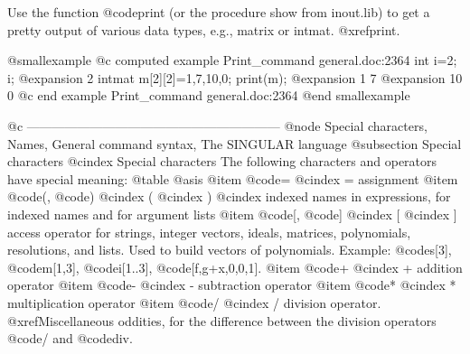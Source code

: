 Use the function @code{print} (or the procedure show from inout.lib)
to get a pretty output of various data
types, e.g., matrix or intmat. @xref{print}.

@smallexample
@c computed example Print_command general.doc:2364 
  int i=2;
  i;
@expansion{} 2
  intmat m[2][2]=1,7,10,0;
  print(m);
@expansion{}      1     7
@expansion{}     10     0
@c end example Print_command general.doc:2364
@end smallexample

@c ------------------------------------------------------------
@node Special characters, Names, General command syntax, The SINGULAR language
@subsection Special characters
@cindex Special characters
The following characters and operators have special meaning:
@table @asis
@item @code{=}
@cindex =
assignment
@item @code{(}, @code{)}
@cindex (
@cindex )
@cindex indexed names
in expressions, for indexed names and for argument lists
@item @code{[}, @code{]}
@cindex [
@cindex ]
access operator for strings, integer vectors, ideals, matrices,
polynomials, resolutions, and lists.  Used to build vectors of
polynomials.  Example: @code{s[3]}, @code{m[1,3]}, @code{i[1..3]},
@code{[f,g+x,0,0,1]}.
@item @code{+}
@cindex +
addition operator
@item @code{-}
@cindex -
subtraction operator
@item @code{*}
@cindex *
multiplication operator
@item @code{/}
@cindex /
division  operator.  @xref{Miscellaneous oddities}, for the difference
between the division operators @code{/} and @code{div}.
